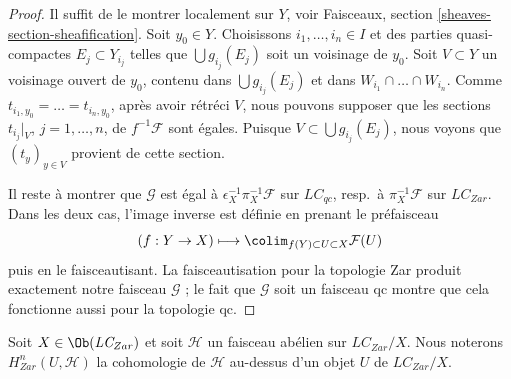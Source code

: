 \begin{proof}
\medskip\noindent
Il suffit de le montrer localement sur $Y$, voir Faisceaux, section
\ref{sheaves-section-sheafification}. Soit $y_0 \in Y$. Choisissons
$i_1, \ldots, i_n \in I$ et des parties quasi-compactes
$E_j \subset Y_{i_j}$ telles que $\bigcup g_{i_j}(E_j)$ soit un voisinage de
$y_0$. Soit $V \subset Y$ un voisinage ouvert de $y_0$, contenu dans
$\bigcup g_{i_j}(E_j)$ et dans $W_{i_1} \cap \ldots \cap W_{i_n}$.
Comme $t_{i_1, y_0} = \ldots = t_{i_n, y_0}$, après avoir rétréci $V$, nous
pouvons supposer que les sections $t_{i_j}|_V$, $j = 1, \ldots, n$, de
$f^{-1}\mathcal{F}$ sont égales. Puisque
$V \subset \bigcup g_{i_j}(E_j)$, nous voyons que $(t_y)_{y \in V}$ provient
de cette section.

\medskip\noindent
Il reste à montrer que $\mathcal{G}$ est égal à
$\epsilon_X^{-1}\pi_X^{-1}\mathcal{F}$ sur $\textit{LC}_{qc}$,
resp.\ à $\pi_X^{-1}\mathcal{F}$ sur $\textit{LC}_{Zar}$.
Dans les deux cas, l'image inverse est définie en prenant le préfaisceau
$$
(f : Y \to X)
\longmapsto
\colim_{f(Y) \subset U \subset X} \mathcal{F}(U)
$$
puis en le faisceautisant. La faisceautisation pour la topologie Zar produit
exactement notre faisceau $\mathcal{G}$ ; le fait que $\mathcal{G}$ soit un
faisceau qc montre que cela fonctionne aussi pour la topologie qc.
\end{proof}

\noindent
Soit $X \in \Ob(\textit{LC}_{Zar})$ et soit $\mathcal{H}$ un faisceau
abélien sur $\textit{LC}_{Zar}/X$. Nous noterons
$H^n_{Zar}(U, \mathcal{H})$ la cohomologie de $\mathcal{H}$ au-dessus d'un
objet $U$ de $\textit{LC}_{Zar}/X$.

